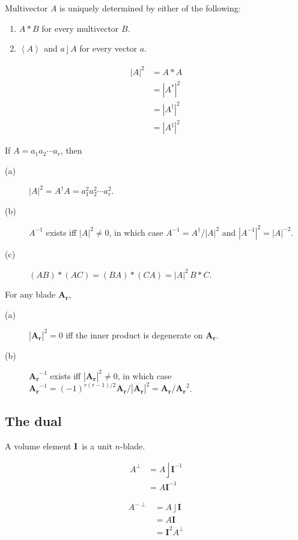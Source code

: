 \documentclass{utarticle}
\newcommand{\bl}[1]{\ensuremath{\bm{#1}}}
\newcommand{\I}{\bl{I}}
\DeclareMathOperator{\lin}{\rfloor}
\newcommand{\grinv}[2][]{\ensuremath{#2^{*#1}}}
\newcommand{\rev}[1]{\ensuremath{#1^\dagger}}
\newcommand{\clifconj}[1]{\ensuremath{#1^\ddagger}}
\newcommand{\scprod}[2]{\ensuremath{#1 * #2}}
\newcommand{\grade}[2][]{\ensuremath{\left\langle #2 \right\rangle_{#1}}}
\newcommand{\dual}[1]{\ensuremath{#1^\perp}}
\newcommand{\invdual}[1]{\ensuremath{#1^{-\perp}}}
\begin{document}
\noindent Multivector $A$ is uniquely determined by either of the following:
\begin{enumerate}
\item \scprod{A}{B} for every multivector $B$.
\item \grade{A} and $a \lin A$ for every vector $a$.
\end{enumerate}

\begin{align}
|A|^2 & = \scprod{A}{A} \\
 & = |\grinv{A}|^2 \\
 & = |\rev{A}|^2 \\
 & = |\clifconj{A}|^2
\end{align}

\noindent If $A = a_1 a_2 \dotsb a_r$, then 
\begin{description}
\item[(a)] $|A|^2 = \rev{A} A = a_1^2 a_2^2 \dotsb a_r^2$.
\item[(b)] $A^{-1}$ exists iff $|A|^2 \neq 0$, in which case $A^{-1} = \rev{A}/|A|^2$
          and $|A^{-1}|^2 = |A|^{-2}$.
\item[(c)] $\scprod{(AB)}{(AC)} = \scprod{(BA)}{(CA)} = |A|^2 \, \scprod{B}{C}$.
\end{description}

\noindent For any blade \bl{A_r}, 
\begin{description}
\item[(a)] $|\bl{A_r}|^2=0$ iff the inner product is degenerate on \bl{A_r}.
\item[(b)] $\bl{A_r}^{-1}$ exists iff $|\bl{A_r}|^2 \neq 0$, in which case
          $\bl{A_r}^{-1} = (-1)^{r(r-1)/2} \bl{A_r}/|\bl{A_r}|^2 = \bl{A_r}/\bl{A_r}^2$.
\end{description}

\subsection{The dual}
\label{app:dual}

A volume element \I\ is a unit $n$-blade.

\begin{align} 
\dual{A} & = A \lin \I^{-1} \\ 
               & = A \I^{-1} 
\end{align}

\begin{align}
\invdual{A} & = A \lin \I \\
                    & = A \I \\
                    & = \I^2 \dual{A} 
\end{align}
\end{document}
